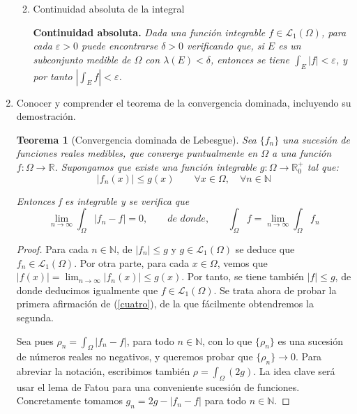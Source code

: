\documentclass[a4paper, 12pt]{article}
\newtheorem*{teorema*}{Teorema}
\begin{document}
\begin{enumerate}[label=\textbf{\arabic*}.]
\begin{enumerate}[label=\textit{\alph*})]
	\medskip
	
	\item Continuidad absoluta de la integral
	
	\textbf{Continuidad absoluta.} \textit{Dada una función integrable \(f \in \mathcal{L}_1 (\Omega)\), para cada \(\varepsilon > 0\) puede encontrarse \(\delta > 0\) verificando que, si \(E\) es un subconjunto medible de \(\Omega\) con \(\lambda (E) < \delta\), entonces se tiene \(\int_E |f| < \varepsilon\), y por tanto \(\left| \int_E f \right| < \varepsilon\).}
\end{enumerate}

\newpage

\item Conocer y comprender el teorema de la convergencia dominada, incluyendo su demostración.

\begin{teorema*}[Convergencia dominada de Lebesgue]
Sea \(\{f_n\}\) una sucesión de funciones reales medibles, que converge puntualmente en \(\Omega\) a una función \(f:\Omega \to \mathbb{R}\). Supongamos que existe una función integrable \(g: \Omega \to \mathbb{R}_0^+\) tal que:
\[
	| f_n(x)| \leq g(x) \qquad \forall x \in \Omega, \quad \forall n \in \mathbb{N}
\]

Entonces f es integrable y se verifica que
\begin{equation}\label{cuatro}
\lim_{n \to \infty} \int_{\Omega} |f_n - f| = 0, \qquad \textit{de donde,} \qquad \int_{\Omega} f = \lim_{n \to \infty} \int_{\Omega} f_n
\end{equation}
\end{teorema*}

\begin{proof}
Para cada \(n \in \mathbb{N}\), de \(|f_n| \leq g\) y \(g \in \mathcal{L}_1 (\Omega)\) se deduce que \(f_n \in \mathcal{L}_1 (\Omega)\). Por otra parte, para cada \(x \in \Omega\), vemos que \(|f(x)| = \lim_{n \to \infty} |f_n(x)| \leq g(x)\). Por tanto, se tiene también \(|f| \leq g\), de donde deducimos igualmente que \(f \in \mathcal{L}_1 (\Omega)\). Se trata ahora de probar la primera afirmación de (\ref{cuatro}), de la que fácilmente obtendremos la segunda.

Sea pues \(\rho_n = \int_{\Omega} |f_n - f|\), para todo \(n \in \mathbb{N}\), con lo que \(\{\rho_n\}\) es una sucesión de números reales no negativos, y queremos probar que \(\{\rho_n\} \to 0\). Para abreviar la notación, escribimos también \(\rho = \int_{\Omega} (2g)\). La idea clave será usar el lema de Fatou para una conveniente sucesión de funciones. Concretamente tomamos \(g_n = 2g - |f_n - f |\) para todo \(n \in \mathbb{N}\).


\end{proof}
\end{enumerate}
\end{document}
